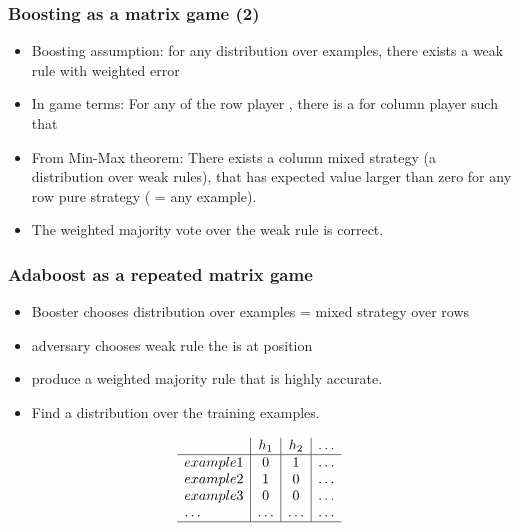\documentclass[handout]{beamer}
\begin{document}
\begin{frame}
  \frametitle{Boosting as a matrix game (2)}
  \begin{itemize}
\item Boosting assumption: for any distribution over examples, there
    exists a weak rule with weighted error 
  \item In game terms: For any  of the row player \R{$\P$},
    there is a  for column player  such that 
  \item From Min-Max theorem: There exists a column mixed strategy (a
    distribution over weak rules), that has expected value larger than
    zero for any row pure strategy ( = any example).
  \item The weighted majority vote over the weak rule is  correct. 
\end{itemize}
\end{frame}

\begin{frame}
\frametitle{Adaboost as a repeated matrix game}
\begin{itemize}
\item Booster chooses distribution over examples = mixed strategy
  over rows 
\item adversary chooses weak rule  the  is at position 
\item {} produce a weighted majority rule that is highly
  accurate.
\item {} Find a  distribution over the training examples.
\end{itemize}
\[  \begin{array}{l|c|c|c}
      & h_1 & h_2 & \ldots  \\
      \hline
      example 1 & 0    & 1 & \ldots\\
      example 2 & 1    & 0  & \ldots\\
      example 3 & 0    & 0  & \ldots\\
      \ldots & \ldots    & \ldots  & \ldots \\
                                     \hline
    \end{array}
  \]
\end{frame}
\end{document}
